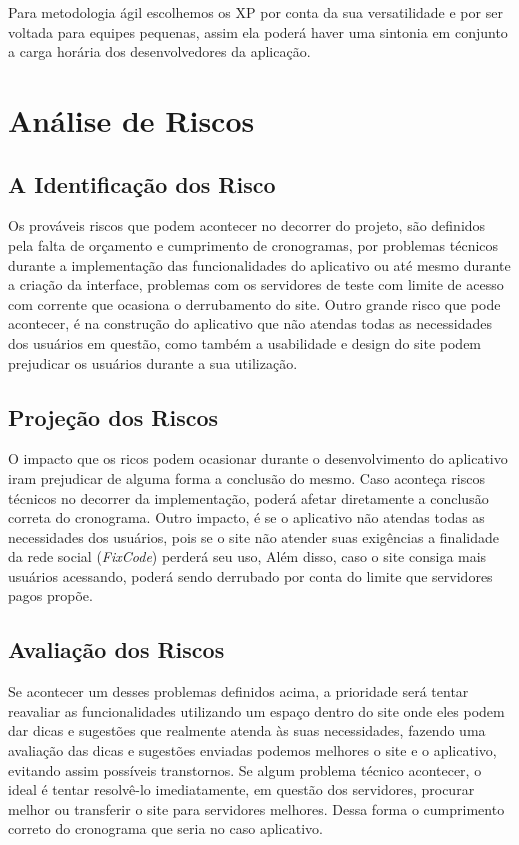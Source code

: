 \documentclass[
	article,			%
	11pt,				%
	oneside,			%
	a4paper,			%
	english,			%
	brazil,				%
	sumario=tradicional
	]{abntex2}
\begin{document}
Para metodologia ágil escolhemos os XP por conta da sua versatilidade e por ser voltada para equipes pequenas, assim ela poderá haver uma sintonia em conjunto a carga horária dos desenvolvedores da aplicação.

\section{Análise de Riscos}

\subsection{A Identificação dos Risco }

Os prováveis riscos que podem acontecer no decorrer do projeto, são definidos pela falta de orçamento e cumprimento de cronogramas, por problemas técnicos durante a implementação das funcionalidades do aplicativo ou até mesmo durante a criação da interface, problemas com os servidores de teste com limite de acesso com corrente que ocasiona o derrubamento do site. Outro grande risco que pode acontecer, é na construção do aplicativo que não atendas todas as necessidades dos usuários em questão, como também a usabilidade e design do site podem prejudicar os usuários durante a sua utilização. 

\subsection{Projeção dos Riscos}

O impacto que os ricos podem ocasionar durante o desenvolvimento do aplicativo iram prejudicar de alguma forma a conclusão do mesmo. Caso aconteça riscos técnicos no decorrer da implementação, poderá afetar diretamente a conclusão correta do cronograma. Outro impacto, é se o aplicativo não atendas todas as necessidades dos usuários, pois se o site não atender suas exigências a finalidade da rede social (\textit{FixCode}) perderá seu uso, Além disso, caso o site consiga mais usuários acessando, poderá sendo derrubado por conta do limite que servidores pagos propõe.

\subsection{Avaliação dos Riscos}

Se acontecer um desses problemas definidos acima, a prioridade será tentar reavaliar as funcionalidades utilizando um espaço dentro do site onde eles podem dar dicas e sugestões que realmente atenda às suas necessidades, fazendo uma avaliação das dicas e sugestões enviadas podemos melhores o site e o aplicativo, evitando assim possíveis transtornos. Se algum problema técnico acontecer, o ideal é tentar resolvê-lo imediatamente, em questão dos servidores, procurar melhor ou transferir o site para servidores melhores. Dessa forma o cumprimento correto do cronograma que seria no caso aplicativo.
\end{document}
